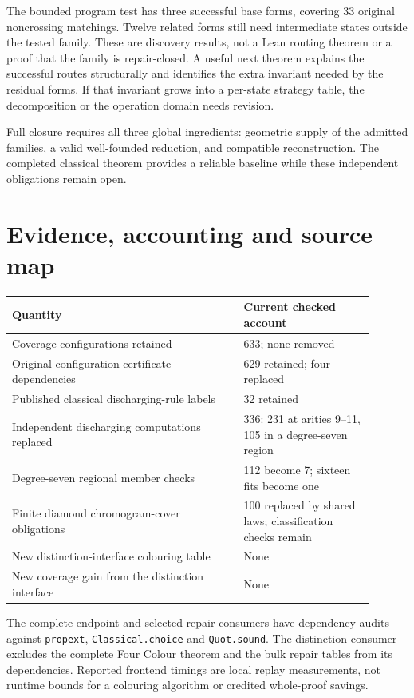 The bounded program test has three successful base forms, covering 33
original noncrossing matchings. Twelve related forms still need
intermediate states outside the tested family. These are discovery
results, not a Lean routing theorem or a proof that the family is
repair-closed. A useful next theorem explains the successful routes
structurally and identifies the extra invariant needed by the residual
forms. If that invariant grows into a per-state strategy table, the
decomposition or the operation domain needs revision.

Full closure requires all three global ingredients: geometric supply of
the admitted families, a valid well-founded reduction, and compatible
reconstruction. The completed classical theorem provides a reliable
baseline while these independent obligations remain open.

\section{Evidence, accounting and source map}
\label{sec:current-evidence}

\begin{center}
\small
\begin{tabular}{@{}p{0.58\linewidth}p{0.32\linewidth}@{}}
\toprule
Quantity & Current checked account \\
\midrule
Coverage configurations retained & 633; none removed \\
Original configuration certificate dependencies & 629 retained; four replaced \\
Published classical discharging-rule labels & 32 retained \\
Independent discharging computations replaced & 336: 231 at arities 9--11,
105 in a degree-seven region \\
Degree-seven regional member checks & 112 become 7; sixteen fits become one \\
Finite diamond chromogram-cover obligations & 100 replaced by shared laws;
classification checks remain \\
New distinction-interface colouring table & None \\
New coverage gain from the distinction interface & None \\
\bottomrule
\end{tabular}
\end{center}

The complete endpoint and selected repair consumers have dependency audits
against \texttt{propext}, \texttt{Classical.choice} and
\texttt{Quot.sound}. The distinction consumer excludes the complete Four
Colour theorem and the bulk repair tables from its dependencies.
Reported frontend timings are local replay measurements, not runtime
bounds for a colouring algorithm or credited whole-proof savings.

